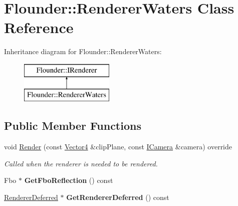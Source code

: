 \hypertarget{class_flounder_1_1_renderer_waters}{}\section{Flounder\+:\+:Renderer\+Waters Class Reference}
\label{class_flounder_1_1_renderer_waters}
Inheritance diagram for Flounder\+:\+:Renderer\+Waters\+:\begin{figure}[H]
\begin{center}
\leavevmode
\includegraphics[height=2.000000cm]{class_flounder_1_1_renderer_waters}
\end{center}
\end{figure}
\subsection*{Public Member Functions}
\begin{DoxyCompactItemize}
\item 
void \hyperlink{class_flounder_1_1_renderer_waters_ac48fe095f41d641fb51a26abe4b1ed6a}{Render} (const \hyperlink{class_flounder_1_1_vector4}{Vector4} \&clip\+Plane, const \hyperlink{class_flounder_1_1_i_camera}{I\+Camera} \&camera) override
\begin{DoxyCompactList}\small\item\em Called when the renderer is needed to be rendered. \end{DoxyCompactList}\item 
\mbox{\label{class_flounder_1_1_renderer_waters_afa21c95fb14ac30bda0992853514e138}} 
Fbo $\ast$ {\bfseries Get\+Fbo\+Reflection} () const
\item 
\mbox{\label{class_flounder_1_1_renderer_waters_a497c41c074a5e8aeecc28242e1580dd9}} 
\hyperlink{class_flounder_1_1_renderer_deferred}{Renderer\+Deferred} $\ast$ {\bfseries Get\+Renderer\+Deferred} () const
\end{DoxyCompactItemize}
